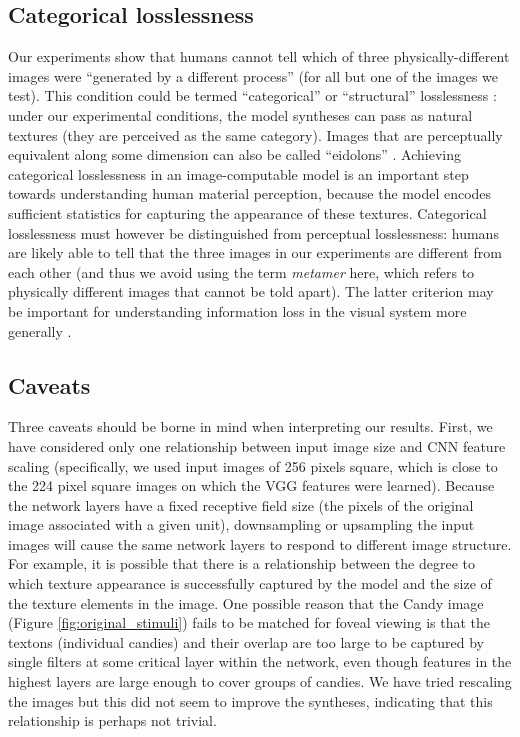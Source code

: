 \documentclass[doc, 11pt,a4paper,natbib]{apa6}\usepackage[]{graphicx}\usepackage[]{color}
\begin{document}
\subsection{Categorical losslessness}
Our experiments show that humans cannot tell which of three physically-different images were ``generated by a different process'' (for all but one of the images we test).
This condition could be termed ``categorical'' or ``structural'' losslessness \citep{pappas_rough_2013}: under our experimental conditions, the model syntheses can pass as natural textures (they are perceived as the same category).
Images that are perceptually equivalent along some dimension can also be called ``eidolons'' \citep{koenderink_eidolons:_2017}.
Achieving categorical losslessness in an image-computable model is an important step towards understanding human material perception, because the model encodes sufficient statistics for capturing the appearance of these textures. 
Categorical losslessness must however be distinguished from perceptual losslessness: humans are likely able to tell that the three images in our experiments are different from each other (and thus we avoid using the term \textit{metamer} here, which refers to physically different images that cannot be told apart).
The latter criterion may be important for understanding information loss in the visual system more generally \citep{freeman_metamers_2011, koenderink_metamerism_1996, wallis_testing_2016, wandell_foundations_1995}.

\subsection{Caveats}

Three caveats should be borne in mind when interpreting our results.
First, we have considered only one relationship between input image size and CNN feature scaling (specifically, we used input images of 256 pixels square, which is close to the 224 pixel square images on which the VGG features were learned).
Because the network layers have a fixed receptive field size (the pixels of the original image associated with a given unit),
downsampling or upsampling the input images will cause the same network layers to respond to different image structure.
For example, it is possible that there is a relationship between the degree to which texture appearance is successfully captured by the model and the size of the texture elements in the image.
One possible reason that the Candy image (Figure \ref{fig:original_stimuli}) fails to be matched for foveal viewing is that the textons (individual candies) and their overlap are too large to be captured by single filters at some critical layer within the network, even though features in the highest layers are large enough to cover groups of candies.
We have tried rescaling the images but this did not seem to improve the syntheses, indicating that this relationship is perhaps not trivial.
\end{document}
